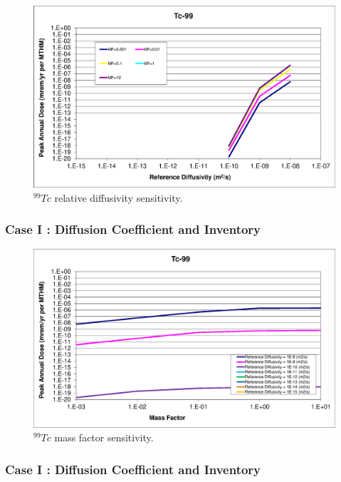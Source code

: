 \begin{frame}[c]
\begin{frame}[c]
\begin{figure}[ht!]
\centering
\includegraphics[width=\linewidth]{DiffCoeffAndInvEBSFail/Tc-99.eps}
\caption{$^{99}Tc$ relative diffusivity sensitivity.} 
\label{fig:DCInvTc99}
\end{figure}
\end{frame}

\begin{frame}[c]
  \frametitle{Case I : Diffusion Coefficient and Inventory}

\begin{figure}[ht!]
\centering
\includegraphics[width=\linewidth]{DiffCoeffAndInvEBSFail/Tc-99-MF.eps}
\caption{$^{99}Tc$ mass factor sensitivity.}
\label{fig:DCInvTc99MF}
\end{figure}
\end{frame}

\begin{frame}[c]
  \frametitle{Case I : Diffusion Coefficient and Inventory}



\end{frame}
\end{frame}
